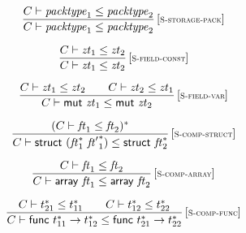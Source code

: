 $$
\begin{array}{@{}c@{}}\displaystyle
\frac{
C \vdash {\mathit{packtype}}_1 \leq {\mathit{packtype}}_2
}{
C \vdash {\mathit{packtype}}_1 \leq {\mathit{packtype}}_2
} \, {[\textsc{\scriptsize S{-}storage{-}pack}]}
\qquad
\end{array}
$$

\vspace{1ex}

$$
\begin{array}{@{}c@{}}\displaystyle
\frac{
C \vdash {\mathit{zt}}_1 \leq {\mathit{zt}}_2
}{
C \vdash {\mathit{zt}}_1 \leq {\mathit{zt}}_2
} \, {[\textsc{\scriptsize S{-}field{-}const}]}
\qquad
\end{array}
$$

$$
\begin{array}{@{}c@{}}\displaystyle
\frac{
C \vdash {\mathit{zt}}_1 \leq {\mathit{zt}}_2
 \qquad
C \vdash {\mathit{zt}}_2 \leq {\mathit{zt}}_1
}{
C \vdash \mathsf{mut}~{\mathit{zt}}_1 \leq \mathsf{mut}~{\mathit{zt}}_2
} \, {[\textsc{\scriptsize S{-}field{-}var}]}
\qquad
\end{array}
$$

\vspace{1ex}

$$
\begin{array}{@{}c@{}}\displaystyle
\frac{
(C \vdash {\mathit{ft}}_1 \leq {\mathit{ft}}_2)^\ast
}{
C \vdash \mathsf{struct}~({{\mathit{ft}}_1^\ast}~{{\mathit{ft}'}_1^\ast}) \leq \mathsf{struct}~{{\mathit{ft}}_2^\ast}
} \, {[\textsc{\scriptsize S{-}comp{-}struct}]}
\qquad
\end{array}
$$

$$
\begin{array}{@{}c@{}}\displaystyle
\frac{
C \vdash {\mathit{ft}}_1 \leq {\mathit{ft}}_2
}{
C \vdash \mathsf{array}~{\mathit{ft}}_1 \leq \mathsf{array}~{\mathit{ft}}_2
} \, {[\textsc{\scriptsize S{-}comp{-}array}]}
\qquad
\end{array}
$$

$$
\begin{array}{@{}c@{}}\displaystyle
\frac{
C \vdash {t_{21}^\ast} \leq {t_{11}^\ast}
 \qquad
C \vdash {t_{12}^\ast} \leq {t_{22}^\ast}
}{
C \vdash \mathsf{func}~{t_{11}^\ast} \rightarrow {t_{12}^\ast} \leq \mathsf{func}~{t_{21}^\ast} \rightarrow {t_{22}^\ast}
} \, {[\textsc{\scriptsize S{-}comp{-}func}]}
\qquad
\end{array}
$$

\vspace{1ex}

